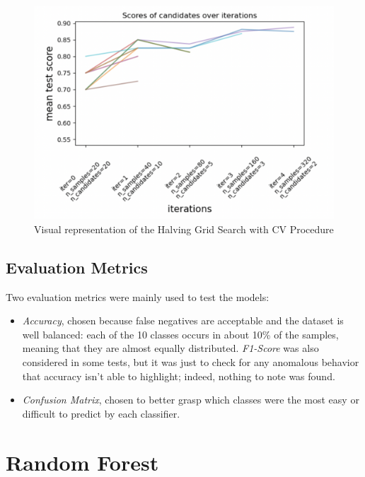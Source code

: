 \begin{figure}[h]
    \centering
    \includegraphics[scale=0.4]{images/halving-grid-search/sklearn-halving-grid-search-visual.png}
    \caption{Visual representation of the Halving Grid Search with CV Procedure}
    \label{fig:halving_grid_search_cv}
\end{figure}

\subsection{Evaluation Metrics}

Two evaluation metrics were mainly used to test the models:

\begin{itemize}
    \item \textit{Accuracy}, chosen because false negatives are acceptable and the dataset is well balanced: each of the 10 classes occurs in about 10\% of the samples, meaning that they are almost equally distributed. \textit{F1-Score} was also considered in some tests, but it was just to check for any anomalous behavior that accuracy isn't able to highlight; indeed, nothing to note was found.
    
    \item \textit{Confusion Matrix}, chosen to better grasp which classes were the most easy or difficult to predict by each classifier.
\end{itemize}


\break
\section{Random Forest}

